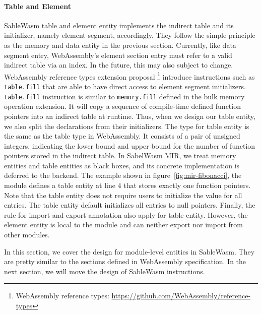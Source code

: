 \paragraph{Table and Element} SableWasm table and element entity implements the indirect table and its initializer, namely element segment, accordingly. They follow the simple principle as the memory and data entity in the previous section. Currently, like data segment entry, WebAssembly's element section entry must refer to a valid indirect table via an index. In the future, this may also subject to change. WebAssembly reference types extension proposal \footnote{WebAssembly reference types: \url{https://github.com/WebAssembly/reference-types}} introduce instructions such as \texttt{table.fill} that are able to have direct access to element segment initializers. \texttt{table.fill} instruction is similar to \texttt{memory.fill} defined in the bulk memory operation extension. It will copy a sequence of compile-time defined function pointers into an indirect table at runtime. Thus, when we design our table entity, we also split the declarations from their initializers. The type for table entity is the same as the table type in WebAssembly. It consists of a pair of unsigned integers, indicating the lower bound and upper bound for the number of function pointers stored in the indirect table. In SabelWasm MIR, we treat memory entities and table entities as black boxes, and its concrete implementation is deferred to the backend. The example shown in figure~\ref{fig:mir-fibonacci}, the module defines a table entity at line 4 that stores exactly one function pointers. Note that the table entity does not require users to initialize the value for all entries. The table entity default initializes all entries to null pointers. Finally, the rule for import and export annotation also apply for table entity. However, the element entity is local to the module and can neither export nor import from other modules. 

In this section, we cover the design for module-level entities in SableWasm. They are pretty similar to the sections defined in WebAssembly specification. In the next section, we will move the design of SableWasm instructions.